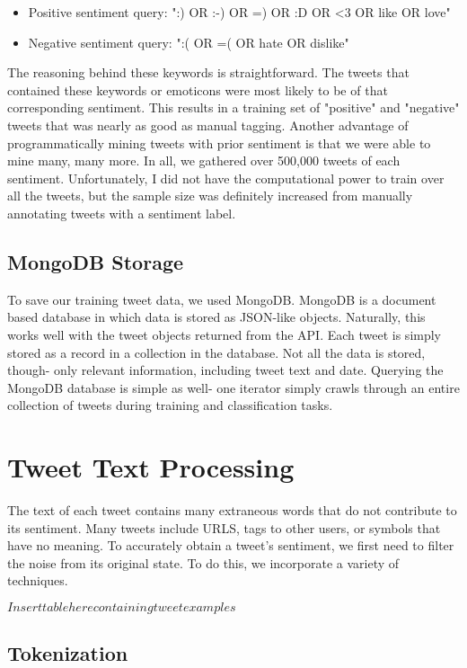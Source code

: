 \documentclass[preprint,pre,floats,aps,amsmath,amssymb,12pt]{revtex4}
\begin{document}
\begin{itemize}
\item Positive sentiment query: ":) OR :-) OR =) OR :D OR <3 OR like OR love"
\item Negative sentiment query: ":( OR =( OR hate OR dislike"
\end{itemize}

The reasoning behind these keywords is straightforward. The tweets that contained these keywords or emoticons were most likely to be of that corresponding sentiment. This results in a training set of "positive" and "negative" tweets that was nearly as good as manual tagging. Another advantage of programmatically mining tweets with prior sentiment is that we were able to mine many, many more. In all, we gathered over 500,000 tweets of each sentiment. Unfortunately, I did not have the computational power to train over all the tweets, but the sample size was definitely increased from manually annotating tweets with a sentiment label. 

\subsection{MongoDB Storage}

To save our training tweet data, we used MongoDB. MongoDB is a document based database in which data is stored as JSON-like objects. Naturally, this works well with the tweet objects returned from the API. Each tweet is simply stored as a record in a collection in the database. Not all the data is stored, though- only relevant information, including tweet text and date. Querying the MongoDB database is simple as well- one iterator simply crawls through an entire collection of tweets during training and classification tasks.  

\section{Tweet Text Processing}
\label{sec:txt}

The text of each tweet contains many extraneous words that do not contribute to its sentiment. Many tweets include URLS, tags to other users, or symbols that have no meaning. To accurately obtain a tweet's sentiment, we first need to filter the noise from its original state. To do this, we incorporate a variety of techniques.

$Insert table here containing tweet examples$

\subsection{Tokenization}
\end{document}
